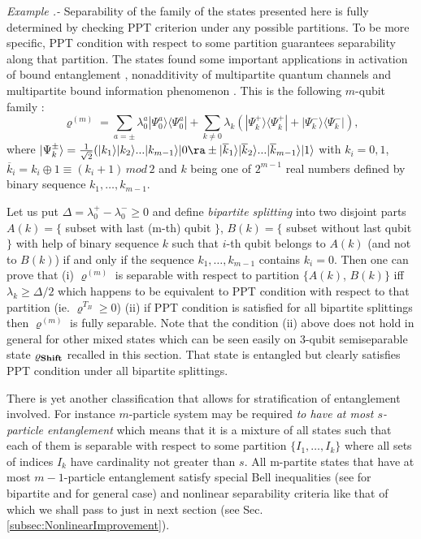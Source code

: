\documentclass[twocolumn,aps,rmp]{revtex4}
\begin{document}
{\it Example .-} Separability of the family of the states presented
here is fully determined by checking PPT criterion under any possible
partitions. To be more specific, PPT condition with respect to some
partition guarantees separability along that partition. The states
found some \cite{DCpur,DurC_multi_dist2000} important applications in
activation of bound entanglement \cite{DurCirac_activation},
nonadditivity of multipartite quantum channels \cite{DuHoCi04} and
multipartite bound information phenomenon
\cite{AcinCM-MultiBoundInfo}.  This is the following $m$-qubit family
\cite{DCpur}:
\begin{equation}
\varrho^{(m)}=\sum_{a=\pm}\lambda_{0}^{a} |\Psi_{0}^{a}\rangle
\langle \Psi_{0}^{a}| + \sum_{k \neq
0}\lambda_{k}(|\Psi_{k}^{+}\rangle \langle \Psi_{k}^{+}| +
|\Psi_{k}^{-}\rangle \langle \Psi_{k}^{-}|), \label{mCirac}
\end{equation}
where $|\Psi_{k}^{\pm}\rangle=\frac{1}{\sqrt{2}}(|k_{1}\rangle|k_{2}\rangle...|k_{m-1}\rangle
|0\ra \pm |\overline{k}_{1}\rangle|
\overline{k}_{2}\rangle...|\overline{k}_{m-1} \rangle |1\rangle$
with $k_{i}=0,1$, $\overline{k}_{i}=k_{i}\oplus 1 \equiv
(k_{i}+1)\, mod\, 2$ and $k$ being one of $2^{m-1}$ real numbers
defined by binary sequence $k_{1}, \ldots ,k_{m-1}$.

Let us put
$\Delta=\lambda_0^{+}-\lambda_0^{-}\geq 0$ and  define {\it
bipartite splitting} into two disjoint parts $A(k)=\{$ subset with
last (m-th) qubit $\}$, $B(k)=\{$ subset without last qubit $\}$
with help of binary sequence $k$ such that $i$-th qubit belongs to
$A(k)$ (and not to $B(k)$) if and only if the sequence $k_{1}, \ldots
,k_{m-1}$ contains $k_{i}=0$. Then one can prove \cite{DCpur} that
(i) $\varrho^{(m)}$ is separable with respect to partition $\{
A(k)$, $B(k) \}$ iff  $\lambda_{k}\geq \Delta/2$ which happens
to be equivalent to PPT condition with respect to that partition
(ie. $\varrho^{T_{B}}\geq 0$) (ii) if PPT condition is satisfied for
all bipartite splittings then $\varrho^{(m)}$ is fully separable.
Note that the condition (ii) above does not hold in general for
other mixed states  which can be seen easily on 3-qubit
semiseparable state $\varrho_{\bf Shift}$ recalled in this section.
That state is entangled but clearly satisfies PPT condition under
all bipartite splittings.


There is yet another classification that allows for stratification of
entanglement involved. For instance $m$-particle system may be
required {\it to have at most $s$-particle entanglement} which means
that it is a mixture of all states such that each of them is separable
with respect to some partition $\{ I_{1}, \ldots, I_{k} \}$ where all
sets of indices $I_{k}$ have cardinality not greater than $s$. All
m-partite states that have at most $m-1$-particle entanglement satisfy
special Bell inequalities (see \cite{Svetlichny1} for bipartite and
\cite{Svetlichny} for general case) and nonlinear separability
criteria like that of \cite{MaasssenU1988} which we shall pass to just
in next section (see Sec.  \ref{subsec:NonlinearImprovement}).
\end{document}
